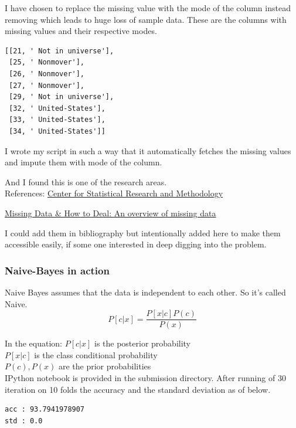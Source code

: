 \documentclass[10pt,a4paper]{article}
\begin{document}
I have chosen to replace the missing value with the mode of the column instead removing which leads to huge loss of sample data. 
These are the columns with missing values and their respective modes.\\
\begin{verbatim}
[[21, ' Not in universe'],
 [25, ' Nonmover'],
 [26, ' Nonmover'],
 [27, ' Nonmover'],
 [29, ' Not in universe'],
 [32, ' United-States'],
 [33, ' United-States'],
 [34, ' United-States']]
\end{verbatim}
I wrote my script in such a way that it automatically fetches the missing values and impute them with mode of the column. 

And I found this is one of the research areas. \\
References: \href{https://www.census.gov/srd/csrm/MissingData.html}{Center for Statistical Research and Methodology}

\href{https://liberalarts.utexas.edu/prc/_files/cs/Missing-Data.pdf}{Missing Data \& How to Deal: An
overview of missing data}

I could add them in bibliography but intentionally added here to make them accessible easily, if some one interested in deep digging into the problem. 

\subsubsection{Naive-Bayes in action}
Naive Bayes assumes that the data is independent to each other. So it's called Naive. 
\begin{equation}
P[c|x] = \frac{P[x|c]P(c)}{P(x)}
\end{equation}

In the equation:
$P[c|x]$ is the posterior probability\\
$ P[x|c]$ is the class conditional probability\\
$P(c) , P(x)$ are the prior probabilities\\

IPython notebook is provided in the submission directory. 
After running of 30 iteration on 10 folds the accuracy and the standard deviation as of below.
\begin{verbatim}
acc : 93.7941978907
std : 0.0
\end{verbatim}
\end{document}
